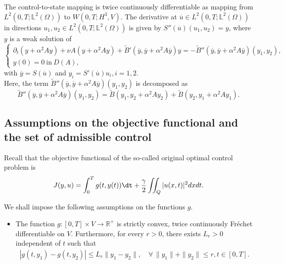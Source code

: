 \documentclass[reqno]{amsart}
\begin{document}
	\begin{theorem}\label{2ndS}
		The control-to-state mapping is twice continuously differentiable as mapping from $ L^2(0,T;\mathbb{L}^2(\Omega)) $ to $ W(0,T;H^3,V) $. The derivative at $ \overline{u} \in L^2(0,T;\mathbb{L}^2(\Omega))$ in directions $ u_1, u_2 \in L^2(0,T;\mathbb{L}^2(\Omega))$ is given by $ S''(\overline{u})(u_1,u_2) = y $, where $ y $ is a weak solution of
		\begin{equation} \label{2nd_S}
			\begin{cases}
				\partial_{t} (y + \alpha^{2} Ay) + \nu A(y + \alpha^{2} Ay) + \widetilde{B}'(\overline{y}, \overline{y}+\alpha^2 A \overline{y})y = -\widetilde{B}''(\overline{y},\overline{y}+\alpha^2 A\overline{y})(y_1,y_2) ,\\
				y(0)=0 \ \text{in} \ D(A),
			\end{cases}
		\end{equation}
		with $ \overline{y} = S(\overline{u}) $ and $ y_i = S'(\overline{u})u_i, i = 1,2 $.\\
		Here, the term $ \widetilde{B}''(\overline{y},\overline{y}+\alpha^2 A\overline{y})(y_1,y_2)  $ is decomposed as
		\[ \widetilde{B}''(\overline{y},\overline{y}+\alpha^2 A\overline{y})(y_1,y_2) = \widetilde{B}(y_1, y_2 + \alpha^2 Ay_2) + \widetilde{B}(y_2, y_1 + \alpha^2 A y_1). \]
	\end{theorem}
	
	\subsection{Assumptions on the objective functional and the set of admissible control}
	
	Recall that the objective functional of the so-called original optimal control problem is
	\begin{align}
		J(y,u) = \int_0^T g(t,y(t))\dt + \frac{\gamma}{2} \iint_Q \vert u(x,t) \vert^2 dxdt. \label{2.44}
	\end{align}
	
	We shall impose the following assumptions on the functions $g$.
	
	\begin{itemize}
		\item[(\textbf{A1})]\label{A1} The function $g: [0,T] \times V
		\rightarrow \mathbb{R}^+$ is strictly convex, twice continuously Fr\'echet differentiable on $V$. Furthermore, for every $r>0$, there exists $L_r>0$ independent of $t$ such that
		\begin{align*}
			|g(t,y_1)-g(t,y_2)|\leq L_r\|y_1-y_2\| , \quad \forall \, \|y_1\|+\|y_2\|\leq r,t\in [0,T].
		\end{align*}
	\end{itemize}
	
\end{document}
